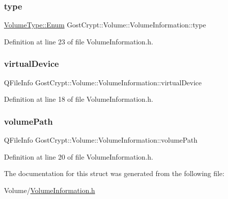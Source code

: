\subsubsection{\texorpdfstring{type}{type}}
{\footnotesize\ttfamily \hyperlink{struct_gost_crypt_1_1_volume_1_1_volume_type_a7fe1979dab76d4534dcb1e26179d4717}{Volume\+Type\+::\+Enum} Gost\+Crypt\+::\+Volume\+::\+Volume\+Information\+::type}



Definition at line 23 of file Volume\+Information.\+h.

\mbox{\label{struct_gost_crypt_1_1_volume_1_1_volume_information_a04d575e85da666853af68cf90a47f5d7}} 
\subsubsection{\texorpdfstring{virtual\+Device}{virtualDevice}}
{\footnotesize\ttfamily Q\+File\+Info Gost\+Crypt\+::\+Volume\+::\+Volume\+Information\+::virtual\+Device}



Definition at line 18 of file Volume\+Information.\+h.

\mbox{\label{struct_gost_crypt_1_1_volume_1_1_volume_information_a7c6d926659681092d8f4b6f8e6898629}} 
\subsubsection{\texorpdfstring{volume\+Path}{volumePath}}
{\footnotesize\ttfamily Q\+File\+Info Gost\+Crypt\+::\+Volume\+::\+Volume\+Information\+::volume\+Path}



Definition at line 20 of file Volume\+Information.\+h.



The documentation for this struct was generated from the following file\+:\begin{DoxyCompactItemize}
\item 
Volume/\hyperlink{_volume_information_8h}{Volume\+Information.\+h}\end{DoxyCompactItemize}
